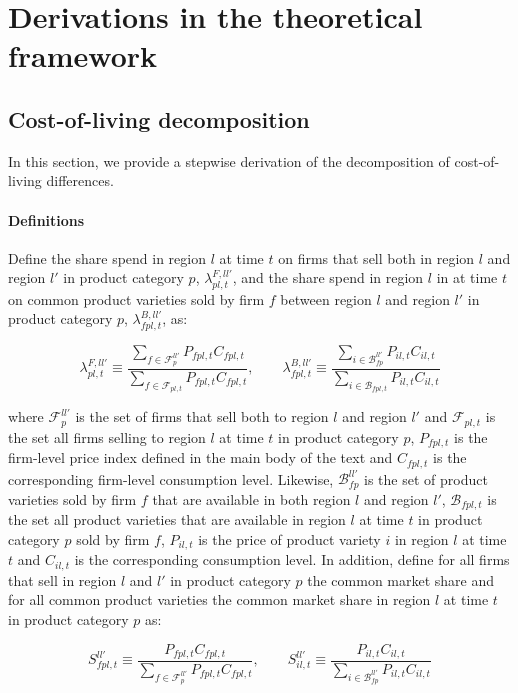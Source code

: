 \section{Derivations in the theoretical framework}
\subsection{Cost-of-living decomposition}
In this section, we provide a stepwise derivation of the decomposition of cost-of-living differences. 

\paragraph{Definitions} Define the share spend in region $l$ at time $t$ on firms that sell both in region $l$ and region $l'$ in product category $p$, $\lambda^{F,ll'}_{pl,t}$, and the share spend in region $l$ in at time $t$ on common product varieties sold by firm $f$ between region $l$ and region $l'$ in product  category $p$, $\lambda^{B,ll'}_{fpl,t}$, as: 
\begin{linenomath*}
    \begin{equation*}
        \lambda^{F,ll'}_{pl,t} \equiv  
            \frac{\sum_{f \in \mathcal{F}^{ll'}_p}P_{fpl,t}C_{fpl,t}}
                 {\sum_{f \in \mathcal{F}_{pl,t}} P_{fpl,t}C_{fpl,t}}, \qquad 
        \lambda^{B,ll'}_{fpl,t} \equiv  
                 \frac{\sum_{i \in \mathcal{B}^{ll'}_{fp}}P_{il,t}C_{il,t}}
                      {\sum_{i \in \mathcal{B}_{fpl,t}} P_{il,t}C_{il,t}}
    \end{equation*}
\end{linenomath*}
\noindent where $\mathcal{F}^{ll'}_p$ is the set of firms that sell both to region $l$ and region $l'$ and $\mathcal{F}_{pl,t}$ is the set all firms selling to region $l$ at time $t$ in product category $p$, $P_{fpl,t}$ is the firm-level price index defined in the main body of the text and $C_{fpl,t}$ is the corresponding firm-level consumption level. Likewise, $\mathcal{B}^{ll'}_{fp}$ is the set of product varieties sold by firm $f$ that are available in both region $l$ and region $l'$, $\mathcal{B}_{fpl,t}$ is the set all product varieties that are available in region $l$ at time $t$ in product category $p$ sold by firm $f$, $P_{il,t}$ is the price of product variety $i$ in region $l$ at time $t$ and $C_{il,t}$ is the corresponding consumption level. In addition, define for all firms that sell in region $l$ and $l'$ in product category $p$ the common market share and for all common product varieties the common market share in region $l$ at time $t$ in product category $p$ as: 
\begin{linenomath*}
    \begin{equation*}
        S^{ll'}_{fpl,t} \equiv  
            \frac{P_{fpl,t}C_{fpl,t}}
                 {\sum_{f \in \mathcal{F}^{ll'}_{p}} P_{fpl,t}C_{fpl,t}}, \qquad 
        S^{ll'}_{il,t} \equiv  
                 \frac{P_{il,t}C_{il,t}}
                      {\sum_{i \in \mathcal{B}^{ll'}_{fp}} P_{il,t}C_{il,t}}
    \end{equation*}
\end{linenomath*}

